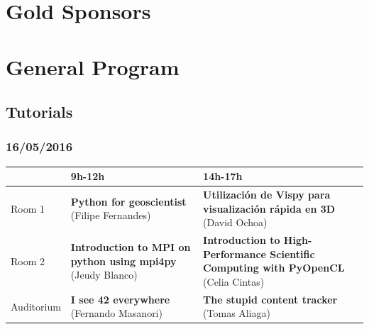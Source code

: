 \documentclass[12pt]{article}
\begin{document}
\newpage

\section*{Gold Sponsors}
\begin{minipage}{0.4\textwidth}

\end{minipage}
\hfill
\begin{minipage}{0.4\textwidth}

\end{minipage}

\vspace*{1cm}

\begin{minipage}{0.4\textwidth}

\end{minipage}
\hfill
\begin{minipage}{0.4\textwidth}

\end{minipage}

\newpage

\section*{General Program}

\subsection*{Tutorials}

\subsubsection*{16/05/2016}

\begin{center}
   {\footnotesize{%
       \begin{tabular}{@{}l p{5cm} p{5cm}@{}}
     \toprule
      & 9h-12h & 14h-17h\\\midrule
     Room 1 & \textbf{Python for geoscientist} (Filipe Fernandes) & \textbf{Utilización de Vispy para visualización rápida en 3D} (David Ochoa)\\
     Room 2 & \textbf{Introduction to MPI on python using mpi4py} (Jeudy Blanco) & \textbf{Introduction to High-Performance Scientific Computing with PyOpenCL} (Celia Cintas)\\
     Auditorium & \textbf{I see 42 everywhere} (Fernando Masanori) & \textbf{The stupid content tracker} (Tomas Aliaga)\\\bottomrule
   \end{tabular}
 }}
\end{center}
\end{document}
